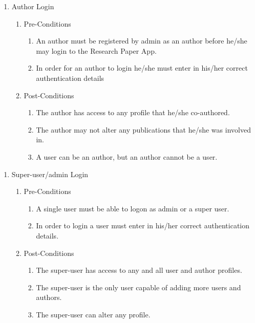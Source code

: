 \documentclass{article} %
\begin{document}
	\begin{enumerate}
		\item  Author Login
		
		\begin{enumerate}
			\item  Pre-Conditions
			
			\begin{enumerate}
				\item  An author must be registered by admin as an author before he/she may login to the Research Paper App.
				
				\item  In order for an author to login he/she must enter in his/her correct authentication details
			\end{enumerate}
			
			\item  Post-Conditions
			
			\begin{enumerate}
				\item  The author has access to any profile that he/she co-authored.
				
				\item  The author may not alter any publications that he/she was involved in.
				
				\item  A user can be an author, but an author cannot be a user.
			\end{enumerate}
		\end{enumerate}
	\end{enumerate}
	
	\noindent  
	
	\begin{enumerate}
		\item  Super-user/admin Login
		
		\begin{enumerate}
			\item  Pre-Conditions
			
			\begin{enumerate}
				\item  A single user must be able to logon as admin or a super user.
				
				\item  In order to login a user must enter in his/her correct authentication details.
			\end{enumerate}
			
			\item  Post-Conditions
			
			\begin{enumerate}
				\item  The super-user has access to any and all user and author profiles.
				
				\item  The super-user is the only user capable of adding more users and authors.
				
				\item  The super-user can alter any profile.
			\end{enumerate}
		\end{enumerate}
	\end{enumerate}
	
\end{document}
